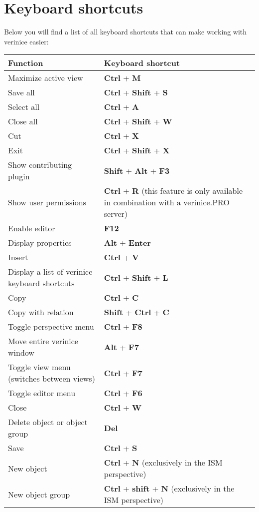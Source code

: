 \documentclass[a4paper,10pt]{book}
\begin{document}
\section{Keyboard shortcuts}
Below you will find a list of all keyboard shortcuts that can make working with verinice easier:
\\
\begin{longtable}{| p{} | p{} |}
\hline
\textbf{Function} & \textbf{Keyboard shortcut} \\[10pt]
\hline\hline
Maximize active view & \textbf{Ctrl} + \textbf{M} \\[10pt] \hline
Save all & \textbf{Ctrl} + \textbf{Shift} + \textbf{S} \\[10pt] \hline
Select all & \textbf{Ctrl} + \textbf{A} \\[10pt] \hline
Close all & \textbf{Ctrl} + \textbf{Shift} + \textbf{W} \\[10pt] \hline
Cut & \textbf{Ctrl} + \textbf{X} \\[10pt] \hline
Exit & \textbf{Ctrl} + \textbf{Shift} + \textbf{X} \\[10pt] \hline
Show contributing plugin & \textbf{Shift} + \textbf{Alt} + \textbf{F3} \\[10pt] \hline
Show user permissions & \textbf{Ctrl} + \textbf{R} (this feature is only available in combination with a verinice.\textsc{PRO} server) \\[10pt] \hline
Enable editor & \textbf{F12} \\[10pt] \hline
Display properties & \textbf{Alt} + \textbf{Enter} \\[10pt] \hline
Insert & \textbf{Ctrl} + \textbf{V} \\[10pt] \hline
Display a list of verinice keyboard shortcuts & \textbf{Ctrl} + \textbf{Shift} + \textbf{L} \\[10pt] \hline
Copy & \textbf{Ctrl} + \textbf{C} \\[10pt] \hline
Copy with relation & \textbf{Shift} + \textbf{Ctrl} + \textbf{C} \\[10pt] \hline
Toggle perspective menu & \textbf{Ctrl} + \textbf{F8} \\[10pt] \hline
Move entire verinice window & \textbf{Alt} + \textbf{F7} \\[10pt] \hline
Toggle view menu (switches between views) & \textbf{Ctrl} + \textbf{F7} \\[10pt] \hline
Toggle editor menu & \textbf{Ctrl} + \textbf{F6} \\[10pt] \hline
Close & \textbf{Ctrl} + \textbf{W} \\[10pt] \hline
Delete object or object group & \textbf{Del} \\[10pt] \hline
Save & \textbf{Ctrl} + \textbf{S} \\[10pt] \hline
New object & \textbf{Ctrl} + \textbf{N} (exclusively in the ISM perspective) \\[10pt] \hline
New object group & \textbf{Ctrl} + \textbf{shift} + \textbf{N} (exclusively in the ISM perspective) \\[10pt] \hline


\end{longtable}
\end{document}
